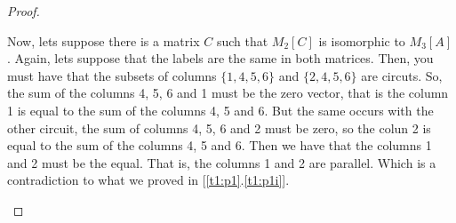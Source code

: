 \begin{proof}
\begin{enumerate}[label=(\roman*)]
            Now, lets suppose there is a matrix $C$ such that $M_2[C]$ is isomorphic to $M_3[A]$. Again, lets suppose that 
            the labels are the same in both matrices. Then, you must have that the subsets of columns $\{1, 4, 5, 6\}$ and 
            $\{2, 4, 5, 6\}$ are circuts. So, the sum of the columns 4, 5, 6 and 1 must be the zero vector, that is the column 1
            is equal to the sum of the columns 4, 5 and 6. But the same occurs with the other circuit, the sum of columns
            4, 5, 6 and 2 must be zero, so the colun 2 is equal to the sum of the columns 4, 5 and 6. Then we have that the
            columns 1 and 2 must be the equal. That is, the columns 1 and 2 are parallel. Which is a contradiction to what we
            proved in [\ref{t1:p1}.\ref{t1:p1i}].
            
        \end{enumerate}
\end{proof}